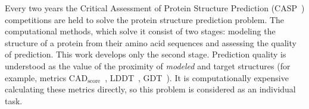 \documentclass[12pt,twosides]{extarticle}
\begin{document}
Every two years the Critical Assessment of Protein Structure Prediction (CASP~\cite{CASP}) competitions are held to solve the protein structure prediction problem. The computational methods, which solve it consist of two stages: modeling the structure of a protein from their amino acid sequences and assessing the quality of prediction. This work develops only the second stage. Prediction quality is understood as the value of the proximity of \textit{modeled} and target structures (for example, metrics $\text{CAD}_\text{score}$~\cite{Olechnovic2013CADscoreAN}, LDDT~\cite{Mariani2013lDDTAL}, GDT~\cite{GDT}). It is computationally expensive calculating these metrics directly, so this problem is considered as an individual task.
\begin{figure}[H]
	\centering
\end{figure}
\end{document}
